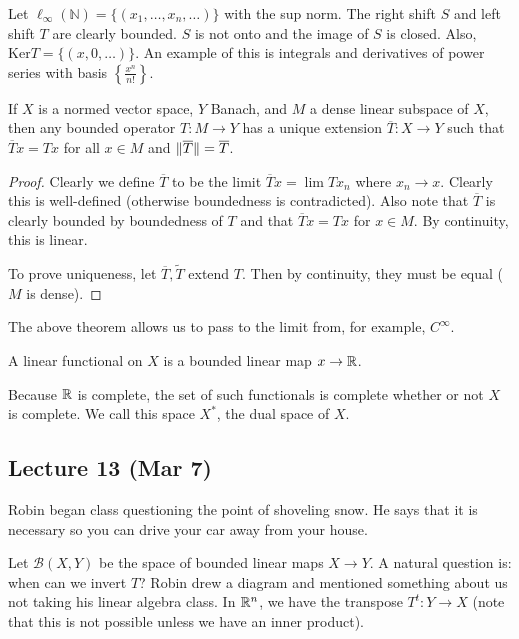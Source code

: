 \documentclass[10pt, twoside]{article}
\begin{document}
    \begin{exm}
        Let $\ell_{\infty}(\mathbb{N}) = \{(x_1, \ldots, x_n, \ldots)\}$ with the sup norm. The right shift $S$ and left shift $T$ are clearly bounded. $S$ is not onto and the image of $S$ is closed. Also, $\mathrm{Ker} T = \{(x,0,\ldots)\}$. An example of this is integrals and derivatives of power series with basis $\left\{ \frac{x^n}{n!} \right\}$.
    \end{exm}

    \begin{thm}[BLT]
        If $X$ is a normed vector space, $Y$ Banach, and $M$ a dense linear subspace of $X$, then any bounded operator $T:M \to Y$ has a unique extension $\overline{T}:X \to Y$ such that $\overline{T}x = Tx$ for all $x \in M$ and $\lVert\overline{T}\rVert = \overline{T}$.
        \begin{proof}
            Clearly we define $\overline{T}$ to be the limit $\overline{T}x = \lim Tx_n$ where $x_n \to x$. Clearly this is well-defined (otherwise boundedness is contradicted). Also note that $\overline{T}$ is clearly bounded by boundedness of $T$ and that $\overline{T}x = Tx$ for $x \in M$. By continuity, this is linear.

            To prove uniqueness, let $\overline{T}, \widetilde{T}$ extend $T$. Then by continuity, they must be equal ($M$ is dense).
        \end{proof}
    \end{thm}
    \begin{rmk}
        The above theorem allows us to pass to the limit from, for example, $C^{\infty}$.
    \end{rmk}
    \begin{defn}
        A linear functional on $X$ is a bounded linear map $x \to \mathbb{R}$.
    \end{defn}

    Because $\mathbb{R}$ is complete, the set of such functionals is complete whether or not $X$ is complete. We call this space $X^*$, the dual space of $X$.

    \subsection{Lecture 13 (Mar 7)}
    Robin began class questioning the point of shoveling snow. He says that it is necessary so you can drive your car away from your house.

    Let $\mathcal{B}(X,Y)$ be the space of bounded linear maps $X \to Y$. A natural question is: when can we invert $T$? Robin drew a diagram and mentioned something about us not taking his linear algebra class. In $\mathbb{R}^n$, we have the transpose $T^t: Y \to X$ (note that this is not possible unless we have an inner product).
\end{document}
